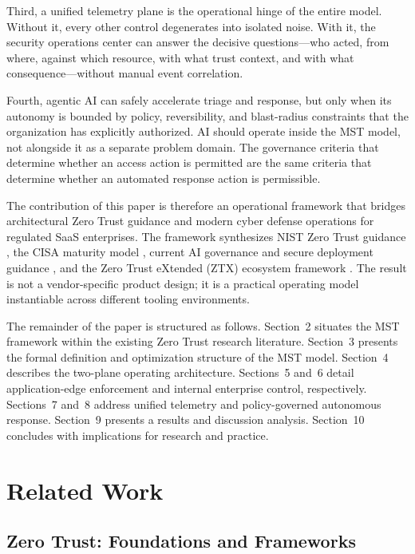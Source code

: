 \documentclass[unnumsec,webpdf,contemporary,large]{oup-authoring-template}
\theoremstyle{thmstyleone}
\theoremstyle{thmstyletwo}
\theoremstyle{thmstylethree}
\begin{document}
Third, a unified telemetry plane is the operational hinge of the entire model.
Without it, every other control degenerates into isolated noise. With it, the
security operations center can answer the decisive questions---who acted, from where,
against which resource, with what trust context, and with what consequence---without
manual event correlation.

Fourth, agentic AI can safely accelerate triage and response, but only when its
autonomy is bounded by policy, reversibility, and blast-radius constraints that the
organization has explicitly authorized. AI should operate inside the MST model, not
alongside it as a separate problem domain. The governance criteria that determine
whether an access action is permitted are the same criteria that determine whether
an automated response action is permissible.

The contribution of this paper is therefore an operational framework that bridges
architectural Zero Trust guidance and modern cyber defense operations for regulated SaaS
enterprises. The framework synthesizes NIST Zero Trust guidance \cite{rose2020,
chandramouli2023}, the CISA maturity model \cite{cisa2023}, current AI governance and
secure deployment guidance \cite{tabassi2023, autio2024, nsa2024, aidatasec2025, ncsc2023,
owasp2025}, and the Zero Trust eXtended (ZTX) ecosystem framework \cite{cunningham2018}. The
result is not a vendor-specific product design; it is a practical operating model
instantiable across different tooling environments.

The remainder of the paper is structured as follows. Section~2 situates the MST framework
within the existing Zero Trust research literature. Section~3 presents the formal definition
and optimization structure of the MST model. Section~4 describes the two-plane operating
architecture. Sections~5 and~6 detail application-edge enforcement and internal enterprise
control, respectively. Sections~7 and~8 address unified telemetry and policy-governed
autonomous response. Section~9 presents a results and discussion analysis. Section~10
concludes with implications for research and practice.

\section{Related Work}

\subsection{Zero Trust: Foundations and Frameworks}
\end{document}
